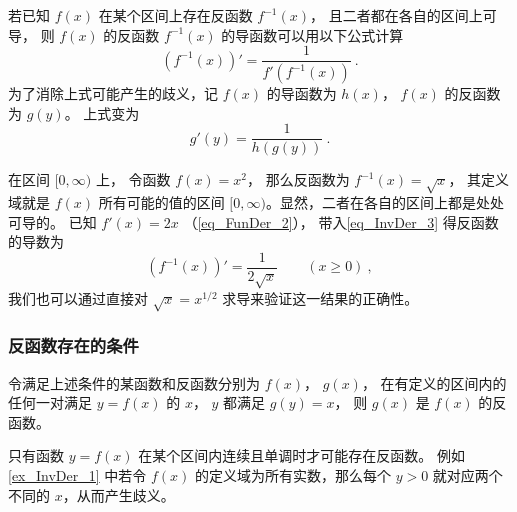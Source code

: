 

若已知 $f(x)$ 在某个区间上存在反函数 $f^{-1}(x)$， 且二者都在各自的区间上可导， 则 $f(x)$ 的反函数 $f^{-1}(x)$ 的导函数可以用以下公式计算
\begin{equation}\label{eq_InvDer_3}
(f^{-1}(x))' = \frac{1}{f'(f^{-1}(x))} ~.
\end{equation} 
为了消除上式可能产生的歧义，记 $f(x)$ 的导函数为 $h(x)$，  $f(x)$ 的反函数为 $g(y)$。 上式变为
 \begin{equation}
g'(y) = \frac{1}{h(g(y))}~.
\end{equation}

\begin{example}{}\label{ex_InvDer_1}
在区间 $[0, \infty)$ 上， 令函数 $f(x) = x^2$， 那么反函数为 $f^{-1}(x) = \sqrt{x}$， 其定义域就是 $f(x)$ 所有可能的值的区间 $[0, \infty)$。显然，二者在各自的区间上都是处处可导的。 已知 $f'(x) = 2x$ （\autoref{eq_FunDer_2}）， 带入\autoref{eq_InvDer_3} 得反函数的导数为
\begin{equation}
(f^{-1}(x))' = \frac{1}{2\sqrt{x}} \qquad (x \ge 0)~,
\end{equation}
我们也可以通过直接对 $\sqrt{x} = x^{1/2}$ 求导来验证这一结果的正确性。
\end{example}

\subsubsection{反函数存在的条件}
令满足上述条件的某函数和反函数分别为 $f(x)$，  $g(x)$， 在有定义的区间内的任何一对满足 $y = f(x)$ 的 $x$，  $y$ 都满足 $g(y) = x$， 则 $g(x)$ 是 $f(x)$ 的反函数。

只有函数 $y = f(x)$ 在某个区间内连续且单调时才可能存在反函数。 例如\autoref{ex_InvDer_1} 中若令 $f(x)$ 的定义域为所有实数，那么每个 $y > 0$  就对应两个不同的 $x$，从而产生歧义。

